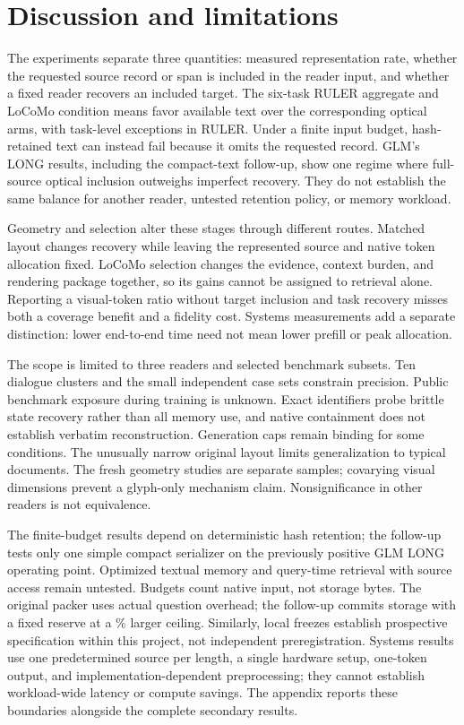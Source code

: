 \documentclass{article}
\begin{document}
\section{Discussion and limitations}
The experiments separate three quantities: measured representation rate, whether the requested source record or span is included in the reader input, and whether a fixed reader recovers an included target. The six-task RULER aggregate and LoCoMo condition means favor available text over the corresponding optical arms, with task-level exceptions in RULER. Under a finite input budget, hash-retained text can instead fail because it omits the requested record. GLM's LONG results, including the compact-text follow-up, show one regime where full-source optical inclusion outweighs imperfect recovery. They do not establish the same balance for another reader, untested retention policy, or memory workload.

Geometry and selection alter these stages through different routes. Matched layout changes recovery while leaving the represented source and native token allocation fixed. LoCoMo selection changes the evidence, context burden, and rendering package together, so its gains cannot be assigned to retrieval alone. Reporting a visual-token ratio without target inclusion and task recovery misses both a coverage benefit and a fidelity cost. Systems measurements add a separate distinction: lower end-to-end time need not mean lower prefill or peak allocation.

The scope is limited to three readers and selected benchmark subsets. Ten dialogue clusters and the small independent case sets constrain precision. Public benchmark exposure during training is unknown. Exact identifiers probe brittle state recovery rather than all memory use, and native containment does not establish verbatim reconstruction. Generation caps remain binding for some conditions. The unusually narrow original layout limits generalization to typical documents. The fresh geometry studies are separate samples; covarying visual dimensions prevent a glyph-only mechanism claim. Nonsignificance in other readers is not equivalence.

The finite-budget results depend on deterministic hash retention; the follow-up tests only one simple compact serializer on the previously positive GLM LONG operating point. Optimized textual memory and query-time retrieval with source access remain untested. Budgets count native input, not storage bytes. The original packer uses actual question overhead; the follow-up commits storage with a fixed reserve at a \% larger ceiling. Similarly, local freezes establish prospective specification within this project, not independent preregistration. Systems results use one predetermined source per length, a single hardware setup, one-token output, and implementation-dependent preprocessing; they cannot establish workload-wide latency or compute savings. The appendix reports these boundaries alongside the complete secondary results.
\end{document}
